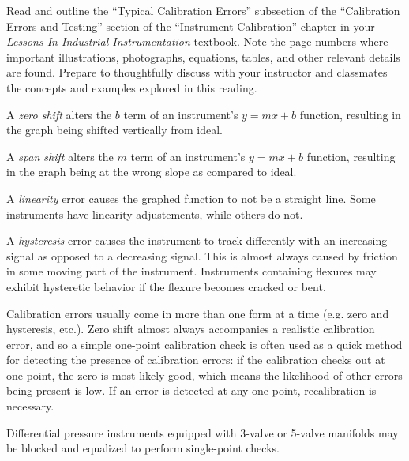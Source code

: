 

Read and outline the ``Typical Calibration Errors'' subsection of the ``Calibration Errors and Testing'' section of the ``Instrument Calibration'' chapter in your {\it Lessons In Industrial Instrumentation} textbook.  Note the page numbers where important illustrations, photographs, equations, tables, and other relevant details are found.  Prepare to thoughtfully discuss with your instructor and classmates the concepts and examples explored in this reading.







 






A {\it zero shift} alters the $b$ term of an instrument's $y = mx + b$ function, resulting in the graph being shifted vertically from ideal.

\vskip 10pt

A {\it span shift} alters the $m$ term of an instrument's $y = mx + b$ function, resulting in the graph being at the wrong slope as compared to ideal.

\vskip 10pt

A {\it linearity} error causes the graphed function to not be a straight line.  Some instruments have linearity adjustements, while others do not.

\vskip 10pt

A {\it hysteresis} error causes the instrument to track differently with an increasing signal as opposed to a decreasing signal.  This is almost always caused by friction in some moving part of the instrument.  Instruments containing flexures may exhibit hysteretic behavior if the flexure becomes cracked or bent.

\vskip 10pt

Calibration errors usually come in more than one form at a time (e.g. zero and hysteresis, etc.).  Zero shift almost always accompanies a realistic calibration error, and so a simple one-point calibration check is often used as a quick method for detecting the presence of calibration errors: if the calibration checks out at one point, the zero is most likely good, which means the likelihood of other errors being present is low.  If an error is detected at any one point, recalibration is necessary.

\vskip 10pt

Differential pressure instruments equipped with 3-valve or 5-valve manifolds may be blocked and equalized to perform single-point checks.





